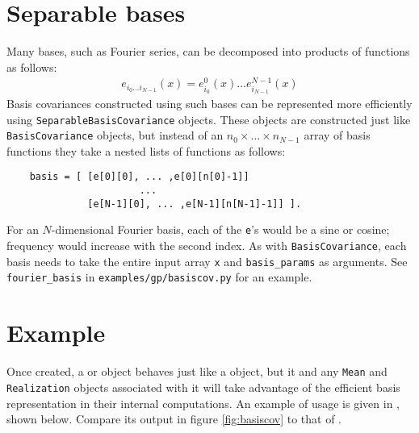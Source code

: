 \section{Separable bases}

Many bases, such as Fourier series, can be decomposed into products of functions as follows:
\begin{eqnarray*}
    e_{i_0\ldots i_{N-1}}(x) = e^0_{i_0}(x)\ldots e^{N-1}_{i_{N-1}}(x)
\end{eqnarray*}
Basis covariances constructed using such bases can be represented more efficiently using \texttt{SeparableBasisCovariance} objects. These objects are constructed just like \texttt{BasisCovariance} objects, but instead of an $n_0\times \ldots \times n_{N-1}$ array of basis functions they take a nested lists of functions as follows:
\begin{verbatim}
    basis = [ [e[0][0], ... ,e[0][n[0]-1]]
                       ...
              [e[N-1][0], ... ,e[N-1][n[N-1]-1]] ].
\end{verbatim}
For an $N$-dimensional Fourier basis, each of the \texttt{e}'s would be a sine or cosine; frequency would increase with the second index. As with \texttt{BasisCovariance}, each basis needs to take the entire input array \texttt{x} and \texttt{basis_params} as arguments. See \texttt{fourier_basis} in \texttt{examples/gp/basiscov.py} for an example.

\section{Example}

Once created, a  or  object behaves just like a  object, but it and any \texttt{Mean} and \texttt{Realization} objects associated with it will take advantage of the efficient basis representation in their internal computations. An example of  usage is given in , shown below. Compare its output in figure \ref{fig:basiscov} to that of .

